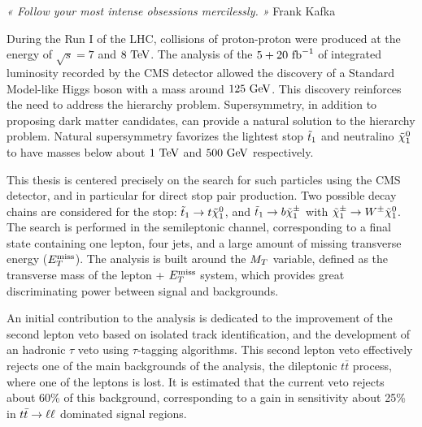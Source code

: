 \vspace*{-0.5cm}
\hspace*{0.37\textwidth}
\begin{minipage}{0.62\textwidth}
\emph{« Follow your most intense obsessions mercilessly. »}
\hspace*{0.6\textwidth} Frank Kafka
\end{minipage}

\vspace*{1cm}

During the Run I of the LHC, collisions of proton-proton were produced at the
energy of $\sqrt{s} = 7$ and $8~\text{TeV}$. The analysis of the $5+20~\text{fb}^{-1}$ of
integrated luminosity recorded by the CMS detector allowed the discovery of a
Standard Model-like Higgs boson with a mass around $125~\text{GeV}$. This discovery
reinforces the need to address the hierarchy problem. Supersymmetry, in addition
to proposing dark matter candidates, can provide a natural solution to the
hierarchy problem. Natural supersymmetry favorizes the lightest stop $\tilde{t}_1$
and neutralino $\tilde{\chi}_1^0$ to have masses below about $1~\text{TeV}$ and $500~\text{GeV}$
respectively.

This thesis is centered precisely on the search for such particles using the CMS
detector, and in particular for direct stop pair production. Two possible decay
chains are considered for the stop: $\tilde{t}_1 \rightarrow t \tilde{\chi}_1^0$, and
$\tilde{t}_1 \rightarrow b \tilde{\chi}_1^\pm$ with $\tilde{\chi}_1^\pm \rightarrow W^\pm
\tilde{\chi}_1^0$. The search is performed in the semileptonic channel,
corresponding to a final state containing one lepton, four jets, and a large
amount of missing transverse energy ($E_T^\text{miss}$). The analysis is built around the
$M_T$ variable, defined as the transverse mass of the lepton + $E_T^\text{miss}$ system,
which provides great discriminating power between signal and backgrounds.

An initial contribution to the analysis is dedicated to the improvement of the
second lepton veto based on isolated track identification, and the development
of an hadronic $\tau$ veto using $\tau$-tagging algorithms. This second lepton
veto effectively rejects one  of the main backgrounds of the analysis, the
dileptonic $t\bar{t}$ process, where one of the leptons is lost. It is estimated
that the current veto rejects about 60\% of this background, corresponding to a
gain in sensitivity about 25\% in $t\bar{t} \rightarrow \ell \ell$ dominated signal regions.

